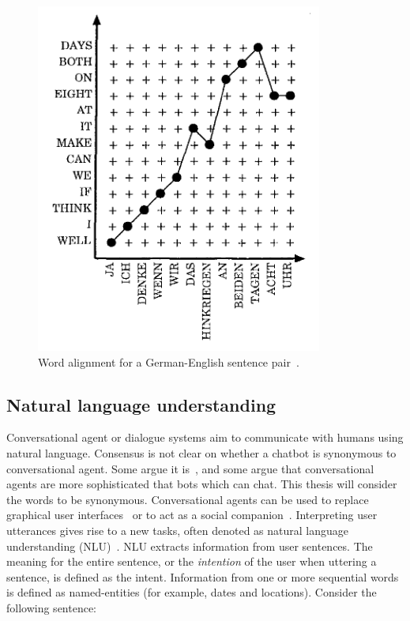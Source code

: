 \begin{figure}[htbp]
    \begin{center}
        \includegraphics[scale=0.4]{figures/alignment.png}
        \vspace*{-2mm}
    \end{center}
    \caption{Word alignment for a German-English sentence pair~\cite[Figure 1]{vogel1996hmm}.}
    \label{fig:alignment}
\end{figure}

\subsection{Natural language understanding}
\label{subsec:nlu}
Conversational agent or dialogue systems aim to communicate with humans using natural language.
Consensus is not clear on whether a chatbot is synonymous to conversational agent.
Some argue it is~\citep{io2017chatbots}, and some argue that conversational agents are more sophisticated that bots which can chat.
This thesis will consider the words to be synonymous.
Conversational agents can be used to replace graphical user interfaces~\citep{brennan1990conversation} or to act as a social companion~\citep{fitzpatrick2017delivering, zhou2018design}.
Interpreting user utterances gives rise to a new tasks, often denoted as natural language understanding (NLU)~\citep{jaech2016domain, braun2017, yang2017end}.
NLU extracts information from user sentences.
The meaning for the entire sentence, or the \textit{intention} of the user when uttering a sentence, is defined as the intent.
Information from one or more sequential words is defined as named-entities (for example, dates and locations).
Consider the following sentence:

